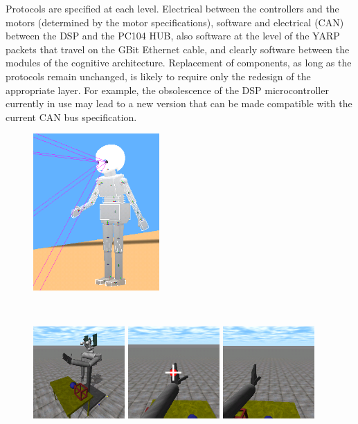 Protocols are specified at each level. Electrical between the controllers and the
motors (determined by the motor specifications), software and electrical (CAN) 
between the DSP and the PC104 HUB, also software at the level of the YARP 
packets that travel on the GBit Ethernet cable, and clearly software between 
the modules of the cognitive architecture. 
Replacement of components, as long as the protocols remain unchanged, is likely
to require only the redesign of the appropriate layer. For example, the obsolescence 
of the DSP microcontroller currently in use may lead to a new version that can 
be made compatible with the current CAN bus specification. 



\begin{figure}[tbp]
\centerline{
\includegraphics[height=6cm]{sim-webot-detail}
}
\ \\
\centerline{
\includegraphics[width=3.5cm]{sim-ode-wide} 
\includegraphics[width=3.5cm]{sim-ode-left} 
\includegraphics[width=3.5cm]{sim-ode-right}
}
\end{figure}
